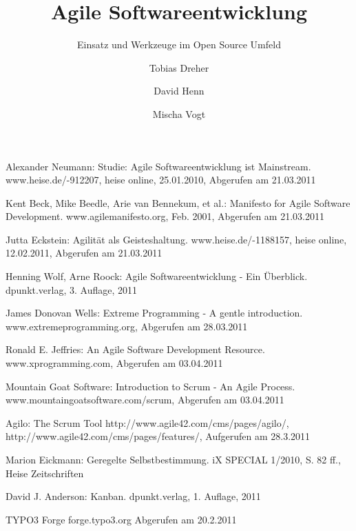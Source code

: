 \documentclass[german,english]{header}
\begin{document}

\title{Agile Softwareentwicklung}
\subtitle{Einsatz und Werkzeuge im Open Source Umfeld}
\author{Tobias Dreher\and David Henn\and Mischa Vogt}

\maketitle







\begin{thebibliography}{5}
Alexander Neumann:
Studie: Agile Softwareentwicklung ist Mainstream.
www.heise.de/-912207, heise online, 25.01.2010, Abgerufen am 21.03.2011

Kent Beck, Mike Beedle, Arie van Bennekum, et al.: 
Manifesto for Agile Software Development.
www.agilemanifesto.org, Feb. 2001, Abgerufen am 21.03.2011

Jutta Eckstein: 
Agilität als Geisteshaltung.
www.heise.de/-1188157, heise online, 12.02.2011, Abgerufen am 21.03.2011

Henning Wolf, Arne Roock: 
Agile Softwareentwicklung - Ein Überblick.
dpunkt.verlag, 3. Auflage, 2011

James Donovan Wells: 
Extreme Programming - A gentle introduction.
www.extremeprogramming.org, Abgerufen am 28.03.2011

Ronald E. Jeffries: 
An Agile Software Development Resource.
www.xprogramming.com, Abgerufen am 03.04.2011

Mountain Goat Software: 
Introduction to Scrum - An Agile Process.
www.mountaingoatsoftware.com/scrum, Abgerufen am 03.04.2011

Agilo: The Scrum Tool
http://www.agile42.com/cms/pages/agilo/,
http://www.agile42.com/cms/pages/features/,
Aufgerufen am 28.3.2011

Marion Eickmann: 
Geregelte Selbstbestimmung.
iX SPECIAL 1/2010, S. 82 ff., Heise Zeitschriften

David J. Anderson: 
Kanban.
dpunkt.verlag, 1. Auflage, 2011

TYPO3 Forge
forge.typo3.org Abgerufen am 20.2.2011


\end{thebibliography}
\end{document}
